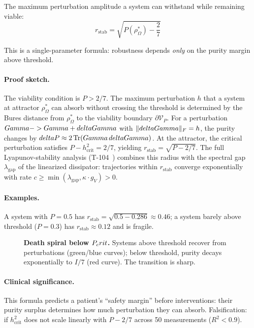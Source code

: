 \begin{theorembox}
The maximum perturbation amplitude a system can withstand while remaining viable:
\begin{equation}
  r_{\mathrm{stab}} = \sqrt{P(\rho^*_\Omega) - \frac{2}{7}}
  \label{eq:stability-radius}
\end{equation}
\end{theorembox}

This is a single-parameter formula: robustness depends \emph{only} on the purity margin
above threshold.

\paragraph{Proof sketch.}
The viability condition is $P > 2/7$. The maximum perturbation $h$ that a system at
attractor $\rho^*_\Omega$ can absorb without crossing the threshold is determined by the
Bures distance from $\rho^*_\Omega$ to the viability boundary $\partial\mathcal{V}_P$.
For a perturbation $Gamma -> Gamma + deltaGamma$ with $\|deltaGamma\|_F = h$, the purity
changes by $delta P \approx 2\Tr(Gamma\,deltaGamma)$. At the attractor, the critical
perturbation satisfies $P - h_{\mathrm{crit}}^2 = 2/7$, yielding
$r_{\mathrm{stab}} = \sqrt{P - 2/7}$. The full Lyapunov-stability analysis
(T-104~) combines this radius with the spectral gap $\lambda_\mathrm{gap}$
of the linearized dissipator: trajectories within $r_\mathrm{stab}$ converge
exponentially with rate $c \ge \min(\lambda_\mathrm{gap}, \kappa\cdot g_V) > 0$.

\paragraph{Examples.}
A system with $P = 0.5$ has $r_{\mathrm{stab}} = \sqrt{0.5 - 0.286}
\approx 0.46$; a system barely above threshold ($P = 0.3$) has $r_{\mathrm{stab}}
\approx 0.12$ and is fragile.

\begin{figure}[H]
\centering

\caption{\textbf{Death spiral below $P_crit$.} Systems above threshold recover from
perturbations (green/blue curves); below threshold, purity decays exponentially to $I/7$
(red curve). The transition is sharp.}
\label{fig:death-spiral}
\end{figure}

\paragraph{Clinical significance.}
This formula predicts a patient's ``safety margin'' before interventions: their purity
surplus determines how much perturbation they can absorb. Falsification: if $h_{\mathrm{crit}}^2$
does not scale linearly with $P - 2/7$ across 50 measurements ($R^2 < 0.9$).


